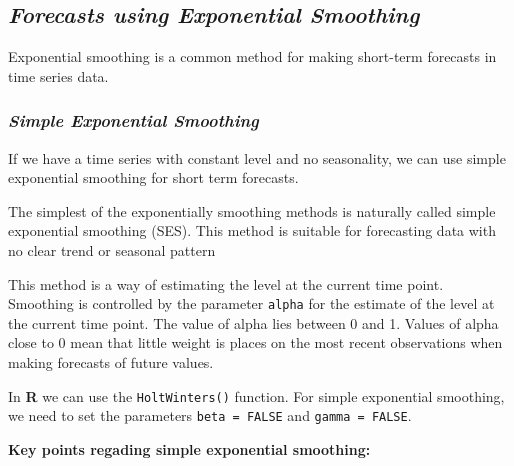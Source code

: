 \documentclass[12pt,openany]{book}
\begin{document}
\hypertarget{forecasts-using-exponential-smoothing}{%
\subsection{\texorpdfstring{\textbf{\emph{Forecasts using Exponential Smoothing}}}{Forecasts using Exponential Smoothing}}\label{forecasts-using-exponential-smoothing}}

Exponential smoothing is a common method for making short-term forecasts in time series data.

\hypertarget{simple-exponential-smoothing}{%
\subsubsection{\texorpdfstring{\textbf{\textbf{\emph{Simple Exponential Smoothing}}}}{Simple Exponential Smoothing}}\label{simple-exponential-smoothing}}

If we have a time series with constant level and no seasonality, we can use simple exponential smoothing for short term forecasts.

The simplest of the exponentially smoothing methods is naturally called simple exponential smoothing (SES). This method is suitable for forecasting data with no clear trend or seasonal pattern

This method is a way of estimating the level at the current time point. Smoothing is controlled by the parameter \texttt{alpha} for the estimate of the level at the current time point. The value of alpha lies between 0 and 1. Values of alpha close to 0 mean that little weight is places on the most recent observations when making forecasts of future values.

In \textbf{R} we can use the \texttt{HoltWinters()} function. For simple exponential smoothing, we need to set the parameters \texttt{beta\ =\ FALSE} and \texttt{gamma\ =\ FALSE}.

\textbf{Key points regading simple exponential smoothing:}
\end{document}
